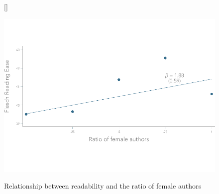 \begin{figure}

	[\FBwidth]
	{
		\caption{Relationship between readability and the ratio of female authors}\label{figureX}
	}
	{
		\includegraphics[width=12.3cm,trim=0cm 2cm 0cm 1.9cm,clip]{0-images/generated/Figure-1.pdf}
	}
\end{figure}